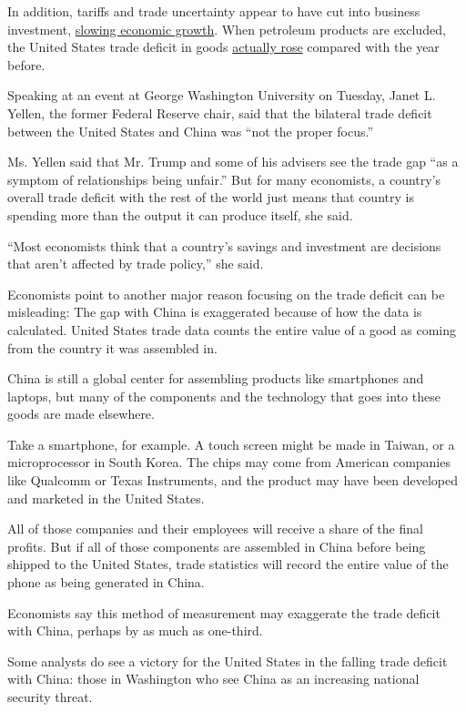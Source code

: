 In addition, tariffs and trade uncertainty appear to have cut into
business investment,
\href{https://www.nytimes3xbfgragh.onion/2020/01/30/business/economy/gdp-numbers.html}{slowing
economic growth}. When petroleum products are excluded, the United
States trade deficit in goods
\href{https://www.census.gov/foreign-trade/Press-Release/current_press_release/exh9.pdf}{actually
rose} compared with the year before.

Speaking at an event at George Washington University on Tuesday, Janet
L. Yellen, the former Federal Reserve chair, said that the bilateral
trade deficit between the United States and China was ``not the proper
focus.''

Ms. Yellen said that Mr. Trump and some of his advisers see the trade
gap ``as a symptom of relationships being unfair.'' But for many
economists, a country's overall trade deficit with the rest of the world
just means that country is spending more than the output it can produce
itself, she said.

``Most economists think that a country's savings and investment are
decisions that aren't affected by trade policy,'' she said.

Economists point to another major reason focusing on the trade deficit
can be misleading: The gap with China is exaggerated because of how the
data is calculated. United States trade data counts the entire value of
a good as coming from the country it was assembled in.

China is still a global center for assembling products like smartphones
and laptops, but many of the components and the technology that goes
into these goods are made elsewhere.

Take a smartphone, for example. A touch screen might be made in Taiwan,
or a microprocessor in South Korea. The chips may come from American
companies like Qualcomm or Texas Instruments, and the product may have
been developed and marketed in the United States.

All of those companies and their employees will receive a share of the
final profits. But if all of those components are assembled in China
before being shipped to the United States, trade statistics will record
the entire value of the phone as being generated in China.

Economists say this method of measurement may exaggerate the trade
deficit with China, perhaps by as much as one-third.

Some analysts do see a victory for the United States in the falling
trade deficit with China: those in Washington who see China as an
increasing national security threat.

